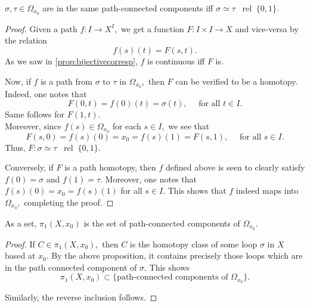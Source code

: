 \documentclass[12pt]{article}
\newcommand{\rel}{\;\;\operatorname{rel}\;}
\begin{document}
\begin{prop}
	$\sigma, \tau \in \Omega_{x_0}$ are in the same path-connected components iff $\sigma \simeq \tau \rel \{0, 1\}.$
\end{prop}
\begin{proof} 
	Given a path $f:I\to X^I,$ we get a function $F:I\times I \to X$ and vice-versa by the relation
	\begin{equation*} 
		f(s)(t) = F(s, t).
	\end{equation*}
	As we saw in \cref{prop:bijectivecorresp}, $f$ is continuous iff $F$ is.

	Now, if $f$ is a path from $\sigma$ to $\tau$ in $\Omega_{x_0},$ then $F$ can be verified to be a homotopy. Indeed, one notes that
	\begin{equation*} 
		F(0, t) = f(0)(t) = \sigma(t), \quad \text{ for all } t \in I.
	\end{equation*}
	Same follows for $F(1, t).$\\
	Moreover, since $f(s) \in \Omega_{x_0}$ for each $s \in I,$ we see that
	\begin{equation*} 
		F(s, 0) = f(s)(0) = x_0 = f(s)(1) = F(s, 1), \quad \text{ for all } s \in I.
	\end{equation*}
	Thus, $F:\sigma\simeq\tau\rel\{0, 1\}.$

	Conversely, if $F$ is a path homotopy, then $f$ defined above is seen to clearly satisfy $f(0) = \sigma$ and $f(1) = \tau.$ Moreover, one notes that $f(s)(0) = x_0 = f(s)(1)$ for all $s \in I.$ This shows that $f$ indeed maps into $\Omega_{x_0},$ completing the proof.
\end{proof}

\begin{cor}
	As a set, $\pi_1(X, x_0)$ is the set of path-connected components of $\Omega_{x_0}.$
\end{cor}

\begin{proof} 
	If $C \in \pi_1(X, x_0),$ then $C$ is the homotopy class of some loop $\sigma$ in $X$ based at $x_0.$ By the above proposition, it contains precisely those loops which are in the path connected component of $\sigma.$ This shows 
	\begin{equation*} 
		\pi_1(X, x_0) \subset \{\text{path-connected components of }\Omega_{x_0}\}.
	\end{equation*}

	Similarly, the reverse inclusion follows.
\end{proof}
\end{document}

